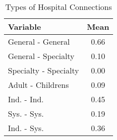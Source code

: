 \begin{table}[ht!]
\centering
\caption{Types of Hospital Connections\label{tab:hospital_pair_types}}
\centering
\begin{tabular}[t]{lc}
\toprule
Variable & Mean\\
\midrule
General - General & 0.66\\
General - Specialty & 0.10\\
Specialty - Specialty & 0.00\\
\addlinespace
Adult - Childrens & 0.09\\
\addlinespace
Ind. - Ind. & 0.45\\
Sys. - Sys. & 0.19\\
Ind. - Sys. & 0.36\\
\bottomrule
\end{tabular}
\end{table}
